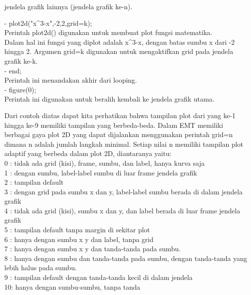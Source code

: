 \documentclass{article}
\begin{document}
\begin{eulernotebook}
\begin{eulercomment}
\begin{eulercomment}
\begin{eulercomment}
\begin{eulercomment}
\begin{eulercomment}
\end{eulercomment}
\begin{eulerttcomment}
 jendela grafik lainnya (jendela grafik ke-n).
\end{eulerttcomment}
\begin{eulercomment}
- plot2d("x\textasciicircum{}3-x",-2,2,grid=k);\\
Perintah plot2d() digunakan untuk membuat plot fungsi matematika.\\
Dalam hal ini fungsi yang diplot adalah x\textasciicircum{}3-x, dengan batas sumbu x
dari -2 hingga 2. Argumen grid=k digunakan untuk mengaktifkan grid
pada jendela grafik ke-k.\\
- end;\\
Perintah ini menandakan akhir dari looping.\\
- figure(0);\\
Perintah ini digunakan untuk beralih kembali ke jendela grafik utama.

Dari contoh diatas dapat kita perhatikan bahwa tampilan plot dari yang
ke-1 hingga ke-9 memiliki tampilan yang berbeda-beda. Dalam EMT
memiliki berbagai gaya plot 2D yang dapat dijalankan menggunakan
perintah grid=n dimana n adalah jumlah langkah minimal. Setiap nilai n
memiliki tampilan plot adaptif yang berbeda dalam plot 2D, diantaranya
yaitu:\\
0 : tidak ada grid (kisi), frame, sumbu, dan label, hanya kurva saja\\
1 : dengan sumbu, label-label sumbu di luar frame jendela grafik\\
2 : tampilan default\\
3 : dengan grid pada sumbu x dan y, label-label sumbu berada di dalam
jendela grafik\\
4 : tidak ada grid (kisi), sumbu x dan y, dan label berada di luar
frame jendela grafik\\
5 : tampilan default tanpa margin di sekitar plot\\
6 : hanya dengan sumbu x y dan label, tanpa grid\\
7 : hanya dengan sumbu x y dan tanda-tanda pada sumbu.\\
8 : hanya dengan sumbu dan tanda-tanda pada sumbu, dengan tanda-tanda
yang lebih halus pada sumbu.\\
9 : tampilan default dengan tanda-tanda kecil di dalam jendela\\
10: hanya dengan sumbu-sumbu, tanpa tanda


\end{eulercomment}
\end{eulercomment}
\end{eulercomment}
\end{eulercomment}
\end{eulercomment}
\end{eulernotebook}
\end{document}
